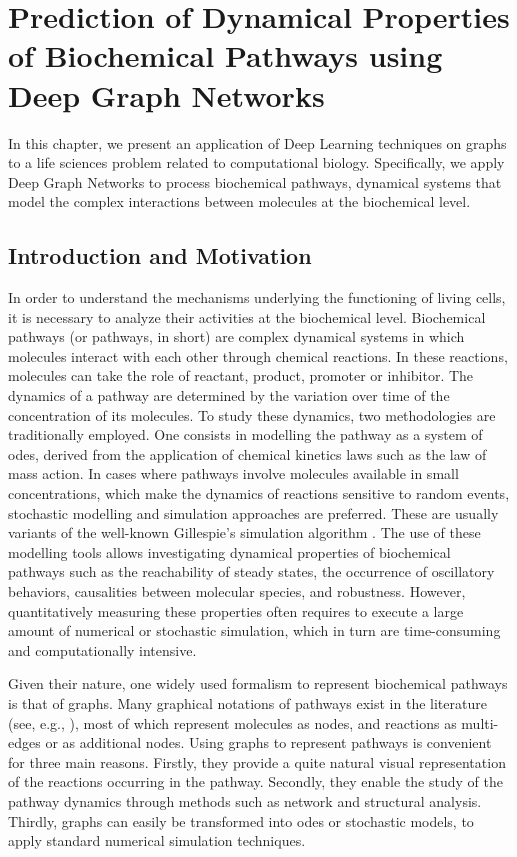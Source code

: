 \chapter{Prediction of Dynamical Properties of Biochemical Pathways using Deep Graph Networks}\label{ch:prediction-biochemical-dgn}

In this chapter, we present an application of Deep Learning techniques on graphs to a life sciences problem related to computational biology. Specifically, we apply Deep Graph Networks to process biochemical pathways, \ie dynamical systems that model the complex interactions between molecules at the biochemical level.

\section{Introduction and Motivation}
In order to understand the mechanisms underlying the functioning of living cells, it is necessary to analyze their activities at the biochemical level. Biochemical pathways (or pathways, in short) are complex dynamical systems in which molecules interact with each other through chemical reactions. In these reactions, molecules can take the role of reactant, product, promoter or inhibitor. The dynamics of a pathway are determined by the variation over time of the concentration of its molecules. To study these dynamics, two methodologies are traditionally employed. One consists in modelling the pathway as a system of \glspl{ode}, derived from the application of chemical kinetics laws such as the law of mass action. In cases where pathways involve molecules available in small concentrations, which make the dynamics of reactions sensitive to random events, stochastic modelling and simulation approaches are preferred. These are usually variants of the well-known Gillespie's simulation algorithm \citep{gillespie1977exact}. The use of these modelling tools allows investigating dynamical properties of biochemical pathways such as the reachability of steady states, the occurrence of oscillatory behaviors, causalities between molecular species, and robustness. However, quantitatively measuring these properties often requires to execute a large amount of numerical or stochastic simulation, which in turn are time-consuming and computationally intensive.

Given their nature, one widely used formalism to represent biochemical pathways is that of graphs. Many graphical notations of pathways exist in the literature (see, e.g., \citet{karp1994representations,reddy1993petri,le2009systems}), most of which represent molecules as nodes, and reactions as multi-edges or as additional nodes. Using graphs to represent pathways is convenient for three main reasons. Firstly, they provide a quite natural visual representation of the reactions occurring in the pathway. Secondly, they enable the study of the pathway dynamics through methods such as network and structural analysis. Thirdly, graphs can easily be transformed into \glspl{ode} or stochastic models, to apply standard numerical simulation techniques.

